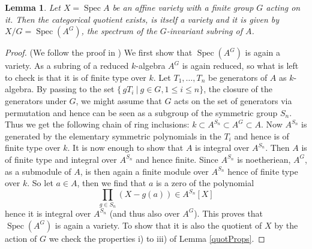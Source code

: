 \documentclass[11pt, a4paper, english, twoside]{article}
\theoremstyle{plain}
\newtheorem{lemma}[theorem]{Lemma}
\theoremstyle{definition}
\DeclareMathOperator{\Spec}{Spec}
\begin{document}
\begin{lemma}
    \label{quotAffine}
    Let $X = \Spec{A}$ be an affine variety with a finite group $G$ acting on it. Then the categorical quotient exists, is itself a variety and
    it is given by $X/G = \Spec(A^G)$, the spectrum of the $G$-invariant subring of $A$.
\end{lemma}
\begin{proof}(We follow the proof in \cite[Prop.\ A.1]{mustata})
    We first show that $\Spec(A^G)$ is again a variety. As a subring of a reduced $k$-algebra $A^G$ is again reduced, so what is left to check
    is that it is of finite type over $k$. Let $T_1,\dots,T_n$ be generators of $A$ as $k$-algebra. By passing to the set 
    ${\{\,gT_i \ |\ g \in G, 1 \leq i \leq n\}}$, the closure of the generators under $G$,
    we might assume that $G$ acts on the set of generators via permutation and hence can be seen as a subgroup of the 
    symmetric group $S_n$. Thus we get the following chain of ring inclusions: $k \subset A^{S_n} \subset A^G \subset A$. Now $A^{S_n}$ is
    generated by the elementary symmetric polynomials in the $T_i$ and hence is of finite type over $k$.
    It is now enough to show that $A$ is integral over $A^{S_n}$. Then $A$ is of finite type and integral over $A^{S_n}$ and hence
    finite. Since $A^{S_n}$ is noetheriean, $A^G$, as a submodule of $A$, 
    is then again a finite module over $A^{S_n}$ hence of finite type over $k$.
    So let $a \in A$, then we find that $a$ is a zero of
    the polynomial
    \[
        \prod_{g \in S_n} (X - g(a))  \in A^{S_n}[X]
    \]
    hence it is integral over $A^{S_n}$ (and thus also over $A^G$).
    This proves that $\Spec(A^G)$ is again a variety. To show that it is also the quotient of $X$ by the action of $G$ we check the properties
    i) to iii) of Lemma \ref{quotProps}. 
    

\end{proof}
\end{document}
